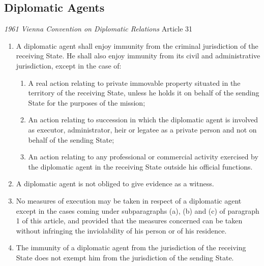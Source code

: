 \subsection{Diplomatic Agents}

\begin{conventiondetails}{\textit{1961 Vienna Convention on Diplomatic Relations} Article 31}
    \flushleft
    \begin{enumerate}
        \item A diplomatic agent shall enjoy immunity from the criminal jurisdiction of the receiving State. He shall also enjoy immunity from its civil and administrative jurisdiction, except in the case of:
        \begin{enumerate}
            \item A real action relating to private immovable property situated in the territory of the receiving State, unless he holds it on behalf of the sending State for the purposes of the mission;
            \item An action relating to succession in which the diplomatic agent is involved as executor, administrator, heir or legatee as a private person and not on behalf of the sending State;
            \item An action relating to any professional or commercial activity exercised by the diplomatic agent in the receiving State outside his official functions.
        \end{enumerate}
        \item A diplomatic agent is not obliged to give evidence as a witness.
        \item No measures of execution may be taken in respect of a diplomatic agent except in the cases coming under subparagraphs (a), (b) and (c) of paragraph 1 of this article, and provided that the measures concerned can be taken without infringing the inviolability of his person or of his residence.
        \item The immunity of a diplomatic agent from the jurisdiction of the receiving State does not exempt him from the jurisdiction of the sending State.
    \end{enumerate}
\end{conventiondetails}

